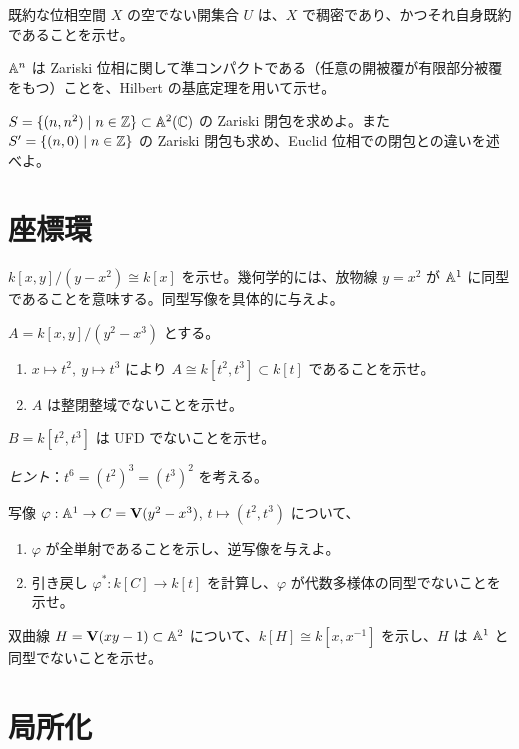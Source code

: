 既約な位相空間 $X$ の空でない開集合 $U$ は、$X$ で稠密であり、かつそれ自身既約であることを示せ。

$\mathbb{A}^n$ は Zariski 位相に関して準コンパクトである（任意の開被覆が有限部分被覆をもつ）ことを、Hilbert の基底定理を用いて示せ。

$S=\{(n,n^2)\mid n\in\mathbb{Z}\}\subset\mathbb{A}^2(\mathbb{C})$ の Zariski 閉包を求めよ。また $S'=\{(n,0)\mid n\in\mathbb{Z}\}$ の Zariski 閉包も求め、Euclid 位相での閉包との違いを述べよ。

\section{座標環}

$k[x,y]/(y-x^2)\cong k[x]$ を示せ。幾何学的には、放物線 $y=x^2$ が $\mathbb{A}^1$ に同型であることを意味する。同型写像を具体的に与えよ。

$A=k[x,y]/(y^2-x^3)$ とする。
\begin{enumerate}
  \item $x\mapsto t^2,\ y\mapsto t^3$ により $A\cong k[t^2,t^3]\subset k[t]$ であることを示せ。
  \item $A$ は整閉整域でないことを示せ。
\end{enumerate}

$B=k[t^2,t^3]$ は UFD でないことを示せ。

\noindent\emph{ヒント}：$t^6=(t^2)^3=(t^3)^2$ を考える。

写像 $\varphi:\mathbb{A}^1\to C=\mathbf{V}(y^2-x^3)$, $t\mapsto(t^2,t^3)$ について、
\begin{enumerate}
  \item $\varphi$ が全単射であることを示し、逆写像を与えよ。
  \item 引き戻し $\varphi^*:k[C]\to k[t]$ を計算し、$\varphi$ が代数多様体の同型でないことを示せ。
\end{enumerate}

双曲線 $H=\mathbf{V}(xy-1)\subset\mathbb{A}^2$ について、$k[H]\cong k[x,x^{-1}]$ を示し、$H$ は $\mathbb{A}^1$ と同型でないことを示せ。

\section{局所化}

